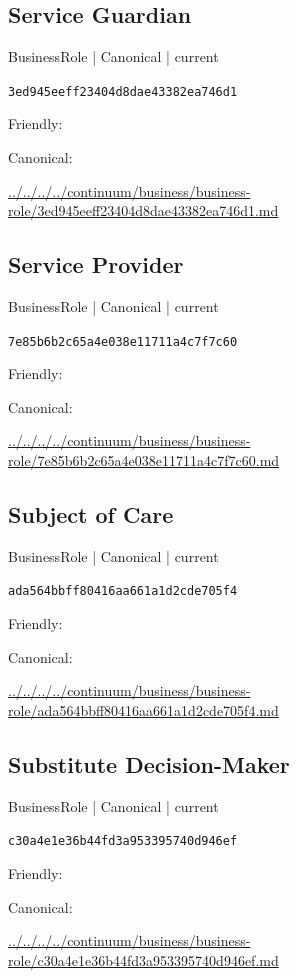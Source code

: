 \documentclass[10pt,a4paper]{article}
\begin{document}
\subsection*{Service Guardian}
{\small BusinessRole | Canonical | current}\par
\texttt{3ed945eeff23404d8dae43382ea746d1}\par
Friendly: \par
Canonical: \par
{\footnotesize\url{../../../../continuum/business/business-role/3ed945eeff23404d8dae43382ea746d1.md}}\par
\subsection*{Service Provider}
{\small BusinessRole | Canonical | current}\par
\texttt{7e85b6b2c65a4e038e11711a4c7f7c60}\par
Friendly: \par
Canonical: \par
{\footnotesize\url{../../../../continuum/business/business-role/7e85b6b2c65a4e038e11711a4c7f7c60.md}}\par
\subsection*{Subject of Care}
{\small BusinessRole | Canonical | current}\par
\texttt{ada564bbff80416aa661a1d2cde705f4}\par
Friendly: \par
Canonical: \par
{\footnotesize\url{../../../../continuum/business/business-role/ada564bbff80416aa661a1d2cde705f4.md}}\par
\subsection*{Substitute Decision-Maker}
{\small BusinessRole | Canonical | current}\par
\texttt{c30a4e1e36b44fd3a953395740d946ef}\par
Friendly: \par
Canonical: \par
{\footnotesize\url{../../../../continuum/business/business-role/c30a4e1e36b44fd3a953395740d946ef.md}}\par
\end{document}

